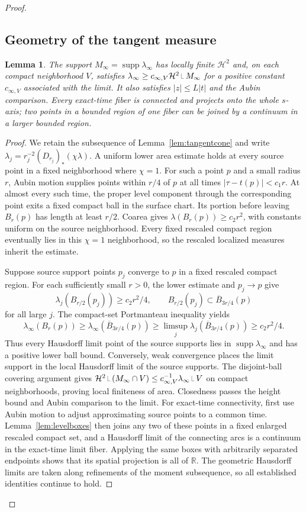 \documentclass[11pt]{article}
\newtheorem{lemma}[theorem]{Lemma}
\newcommand{\R}{\mathbb R}
\newcommand{\HH}{\mathcal H}
\newcommand{\supp}{\operatorname{supp}}
\newcommand{\restr}{\mathbin{\vrule height 1.4ex depth 0pt width .06ex\vrule height .06ex depth 0pt width .65ex}}
\begin{document}
\begin{proof}
\subsection{Geometry of the tangent measure}
\begin{lemma}\label{lem:limitgeometry}
The support $M_\infty=\supp\lambda_\infty$ has locally finite $\HH^2$ and, on each compact neighborhood $V$, satisfies $\lambda_\infty\ge c_{\infty,V}\HH^2\restr M_\infty$ for a positive constant $c_{\infty,V}$ associated with the limit. It also satisfies $|z|\le L|t|$ and the Aubin comparison. Every exact-time fiber is connected and projects onto the whole $s$-axis; two points in a bounded region of one fiber can be joined by a continuum in a larger bounded region.
\end{lemma}
\begin{proof}
We retain the subsequence of Lemma~\ref{lem:tangentcone} and write $\lambda_j=r_j^{-2}(D_{r_j})_*(\chi\lambda)$. A uniform lower area estimate holds at every source point in a fixed neighborhood where $\chi=1$. For such a point $p$ and a small radius $r$, Aubin motion supplies points within $r/4$ of $p$ at all times $|\tau-t(p)|<c_1r$. At almost every such time, the proper level component through the corresponding point exits a fixed compact ball in the surface chart. Its portion before leaving $B_r(p)$ has length at least $r/2$. Coarea gives $\lambda(B_r(p))\ge c_2r^2$, with constants uniform on the source neighborhood. Every fixed rescaled compact region eventually lies in this $\chi=1$ neighborhood, so the rescaled localized measures inherit the estimate.

Suppose source support points $p_j$ converge to $p$ in a fixed rescaled compact region. For each sufficiently small $r>0$, the lower estimate and $p_j\to p$ give
\[
 \lambda_j(B_{r/2}(p_j))\ge c_2r^2/4,
 \qquad B_{r/2}(p_j)\subset\overline B_{3r/4}(p)
\]
for all large $j$. The compact-set Portmanteau inequality yields
\[
 \lambda_\infty(B_r(p))
 \ge\lambda_\infty(\overline B_{3r/4}(p))
 \ge\limsup_j\lambda_j(\overline B_{3r/4}(p))
 \ge c_2r^2/4.
\]
Thus every Hausdorff limit point of the source supports lies in $\supp\lambda_\infty$ and has a positive lower ball bound. Conversely, weak convergence places the limit support in the local Hausdorff limit of the source supports. The disjoint-ball covering argument gives $\HH^2\restr(M_\infty\cap V)\le c_{\infty,V}^{-1}\lambda_\infty\restr V$ on compact neighborhoods, proving local finiteness of area. Closedness passes the height bound and Aubin comparison to the limit. For exact-time connectivity, first use Aubin motion to adjust approximating source points to a common time. Lemma~\ref{lem:levelboxes} then joins any two of these points in a fixed enlarged rescaled compact set, and a Hausdorff limit of the connecting arcs is a continuum in the exact-time limit fiber. Applying the same boxes with arbitrarily separated endpoints shows that its spatial projection is all of $\R$. The geometric Hausdorff limits are taken along refinements of the moment subsequence, so all established identities continue to hold.
\end{proof}


\end{proof}
\end{document}
